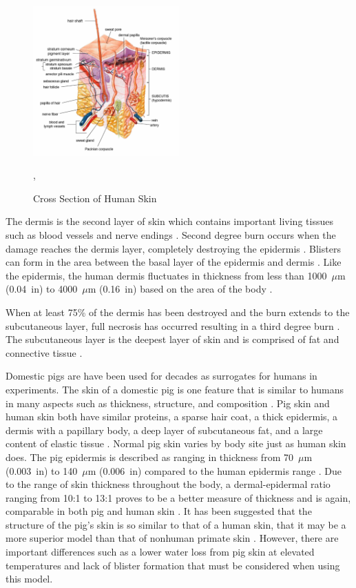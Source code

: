 \documentclass[12pt,oneside]{book}
\begin{document}
\begin{figure}[H]
\centering
\includegraphics[width=0.5\textwidth]{../0_Images/Instrumentation/Burn_Measurements/human_skin}
\caption{Cross Section of Human Skin}
\label{fig:inst_human_skin},
\end{figure}

The dermis is the second layer of skin which contains important living tissues such as blood vessels and nerve endings \cite{Hummel_Barker_Lyons}. Second degree burn occurs when the damage reaches the dermis layer, completely destroying the epidermis \cite{Hummel_Barker_Lyons}. Blisters can form in the area between the basal layer of the epidermis and dermis \cite{Purser_Toxicity_Heat}. Like the epidermis, the human dermis fluctuates in thickness from less than 1000~$\mu$m (0.04~in) to 4000~$\mu$m (0.16~in) based on the area of the body \cite{Skin_Pulse,Visualization_Thickness}.

When at least 75\% of the dermis has been destroyed and the burn extends to the subcutaneous layer, full necrosis has occurred resulting in a third degree burn \cite{Purser_Toxicity_Heat}. The subcutaneous layer is the deepest layer of skin and is comprised of fat and connective tissue \cite{Hummel_Barker_Lyons}.

Domestic pigs are have been used for decades as surrogates for humans in experiments. The skin of a domestic pig is one feature that is similar to humans in many aspects such as thickness, structure, and composition \cite{Time_Temperature_Cutaneous_Burns}. Pig skin and human skin both have similar proteins, a sparse hair coat, a thick epidermis, a dermis with a papillary body, a deep layer of subcutaneous fat, and a large content of elastic tissue \cite{Of_pigs_and_men}. Normal pig skin varies by body site just as human skin does. The pig epidermis is described as ranging in thickness from 70~$\mu$m (0.003~in) to 140~$\mu$m (0.006~in) compared to the human epidermis range \cite{Pig_Experimental_model}. Due to the range of skin thickness throughout the body, a dermal-epidermal ratio ranging from 10:1 to 13:1 proves to be a better measure of thickness and is again, comparable in both pig and human skin \cite{Pigs_Wound_Healing}.  It has been suggested that the structure of the pig's skin is so similar to that of a human skin, that it may be a more{} superior model than that of nonhuman primate skin \cite{Sensitivity_Cross-reacting}. However, there are important differences such as a lower water loss from pig skin at elevated temperatures and lack of blister formation that must be considered when using this model.
\end{document}
